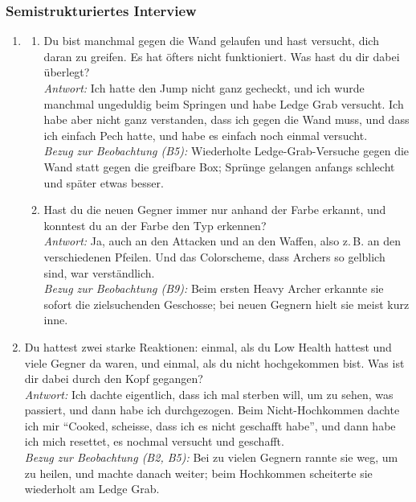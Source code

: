 \documentclass[../Main.tex]{subfiles}
\begin{document}
\subsubsection{Semistrukturiertes Interview}

\begin{enumerate}[label=\textbf{I\arabic*}, leftmargin=1.5cm, itemsep=1em]
    \item
    \begin{enumerate}[label=\alph*), itemsep=0.6em]
        \item Du bist manchmal gegen die Wand gelaufen und hast versucht, dich daran zu greifen. Es hat öfters nicht funktioniert. Was hast du dir dabei überlegt? \\
            \textit{Antwort:} Ich hatte den Jump nicht ganz gecheckt, und ich wurde manchmal ungeduldig beim Springen und habe Ledge Grab versucht. Ich habe aber nicht ganz verstanden, dass ich gegen die Wand muss, und dass ich einfach Pech hatte, und habe es einfach noch einmal versucht. \\
            \textit{Bezug zur Beobachtung (B5):} Wiederholte Ledge-Grab-Versuche gegen die Wand statt gegen die greifbare Box; Sprünge gelangen anfangs schlecht und später etwas besser.
        \item Hast du die neuen Gegner immer nur anhand der Farbe erkannt, und konntest du an der Farbe den Typ erkennen? \\
            \textit{Antwort:} Ja, auch an den Attacken und an den Waffen, also z.\,B. an den verschiedenen Pfeilen. Und das Colorscheme, dass Archers so gelblich sind, war verständlich. \\
            \textit{Bezug zur Beobachtung (B9):} Beim ersten Heavy Archer erkannte sie sofort die zielsuchenden Geschosse; bei neuen Gegnern hielt sie meist kurz inne.
    \end{enumerate}

\item Du hattest zwei starke Reaktionen: einmal, als du Low Health hattest und viele Gegner da waren, und einmal, als du nicht hochgekommen bist. Was ist dir dabei durch den Kopf gegangen? \\
    \textit{Antwort:} Ich dachte eigentlich, dass ich mal sterben will, um zu sehen, was passiert, und dann habe ich durchgezogen. Beim Nicht-Hochkommen dachte ich mir \enquote{Cooked, scheisse, dass ich es nicht geschafft habe}, und dann habe ich mich resettet, es nochmal versucht und geschafft. \\
    \textit{Bezug zur Beobachtung (B2, B5):} Bei zu vielen Gegnern rannte sie weg, um zu heilen, und machte danach weiter; beim Hochkommen scheiterte sie wiederholt am Ledge Grab.


\end{enumerate}
\end{document}
